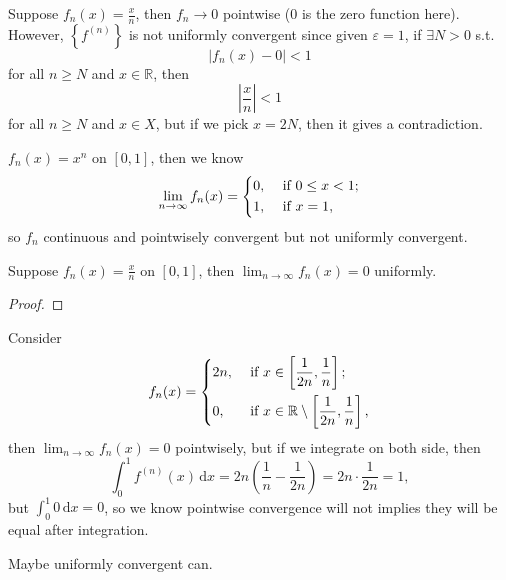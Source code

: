 \begin{eg}
    Suppose \(f_n(x) = \frac{x}{n}\), then \(f_n \to 0\) pointwise (\(0\) is the zero function here). However, \(\left\{ f^{(n)} \right\} \) is not uniformly convergent since given \(\varepsilon = 1\), if \(\exists N > 0\) s.t. 
    \[
        \left\vert f_n(x) - 0 \right\vert < 1 
    \] for all \(n \ge N\) and \(x \in \mathbb{R} \), then 
    \[
        \left\vert \frac{x}{n} \right\vert < 1 
    \] for all \(n \ge N\) and \(x \in X\), but if we pick \(x = 2N\), then it gives a contradiction.   
\end{eg}

\begin{eg}
    \(f_n(x) = x^n\) on \([0, 1]\), then we know
    \[
        \lim_{n \to \infty} f_n(x) = \begin{dcases}
            0, &\text{ if } 0 \le x < 1 ;\\
            1, &\text{ if } x = 1,
        \end{dcases} 
    \]  so \(f_n\) continuous and pointwisely convergent but not uniformly convergent.  
\end{eg}

\begin{eg}
    Suppose \(f_n(x) = \frac{x}{n}\) on \([0, 1]\), then \(\lim_{n \to \infty} f_n(x) = 0 \) uniformly.    
\end{eg}
\begin{proof}
\end{proof}

\begin{eg}
    Consider 
    \[
        f_n(x) = \begin{dcases}
            2n, &\text{ if }  x \in \left[ \frac{1}{2n}, \frac{1}{n} \right] ;\\
            0, &\text{ if } x \in \mathbb{R} \setminus \left[ \frac{1}{2n}, \frac{1}{n} \right],
        \end{dcases}
    \] then \(\lim_{n \to \infty} f_n(x) = 0 \) pointwisely, but if we integrate on both side, then 
    \[
        \int _0^1 f^{(n)}(x) \, \mathrm{d} x = 2n \left( \frac{1}{n} - \frac{1}{2n} \right) = 2n \cdot \frac{1}{2n} = 1,  
    \] but \(\int _0^1 0 \, \mathrm{d} x = 0 \), so we know pointwise convergence will not implies they will be equal after integration. 
    \begin{remark}
        Maybe uniformly convergent can.
    \end{remark} 
\end{eg}